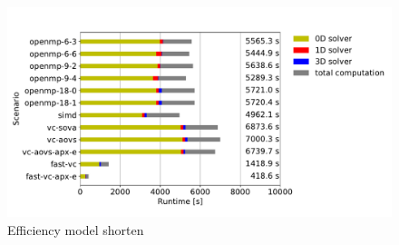 \begin{figure}
  \centering%
  \includegraphics[width=\textwidth]{images/results/studies/fibers_emg_study_shorten.pdf}%
  \caption{Efficiency model shorten}%
  \label{fig:fibers_emg_study_shorten}%
\end{figure}%

